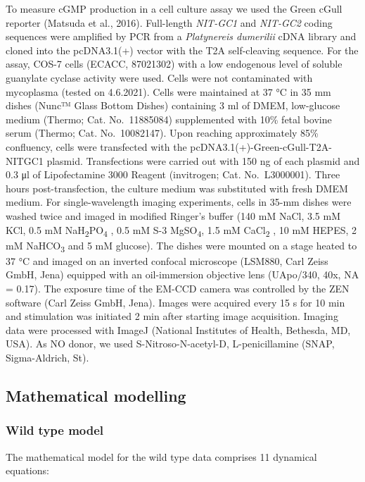 \documentclass[
  11pt,
  letterpaper,
  DIV=11,
  numbers=noendperiod]{scrartcl}
\begin{document}
To measure cGMP production in a cell culture assay we used the Green
cGull reporter (Matsuda et al., 2016). Full-length \emph{NIT-GC1} and
\emph{NIT-GC2} coding sequences were amplified by PCR from a
\emph{Platynereis dumerilii} cDNA library and cloned into the
pcDNA3.1(+) vector with the T2A self-cleaving sequence. For the assay,
COS-7 cells (ECACC, 87021302) with a low endogenous level of soluble
guanylate cyclase activity were used. Cells were not contaminated with
mycoplasma (tested on 4.6.2021). Cells were maintained at 37 °C in 35 mm
dishes (Nunc™ Glass Bottom Dishes) containing 3 ml of DMEM, low-glucose
medium (Thermo; Cat. No.~11885084) supplemented with 10\% fetal bovine
serum (Thermo; Cat. No.~10082147). Upon reaching approximately 85\%
confluency, cells were transfected with the
pcDNA3.1(+)-Green-cGull-T2A-NITGC1 plasmid. Transfections were carried
out with 150 ng of each plasmid and 0.3 μl of Lipofectamine 3000 Reagent
(invitrogen; Cat. No.~L3000001). Three hours post-transfection, the
culture medium was substituted with fresh DMEM medium. For
single-wavelength imaging experiments, cells in 35-mm dishes were washed
twice and imaged in modified Ringer's buffer (140 mM NaCl, 3.5 mM KCl,
0.5 mM NaH\textsubscript{2}PO\textsubscript{4} , 0.5 mM S-3
MgSO\textsubscript{4}, 1.5 mM CaCl\textsubscript{2} , 10 mM HEPES, 2 mM
NaHCO\textsubscript{3} and 5 mM glucose). The dishes were mounted on a
stage heated to 37 °C and imaged on an inverted confocal microscope
(LSM880, Carl Zeiss GmbH, Jena) equipped with an oil-immersion objective
lens (UApo/340, 40x, NA = 0.17). The exposure time of the EM-CCD camera
was controlled by the ZEN software (Carl Zeiss GmbH, Jena). Images were
acquired every 15 s for 10 min and stimulation was initiated 2 min after
starting image acquisition. Imaging data were processed with ImageJ
(National Institutes of Health, Bethesda, MD, USA). As NO donor, we used
S-Nitroso-N-acetyl-D, L-penicillamine (SNAP, Sigma-Aldrich, St).

\subsection{Mathematical modelling}\label{mathematical-modelling}

\subsubsection{Wild type model}\label{wild-type-model}

The mathematical model for the wild type data comprises 11 dynamical
equations:
\end{document}
